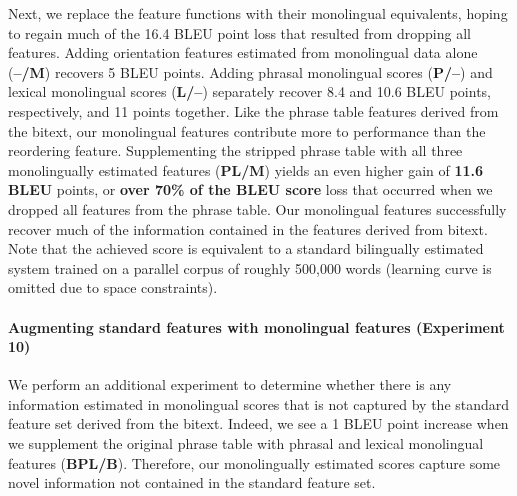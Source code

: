 \documentclass[11pt]{article}
\begin{document}
Next, we replace the feature functions with their monolingual equivalents, hoping to regain much of the 16.4 BLEU point loss that resulted from dropping all features.  Adding orientation features estimated from monolingual data alone ({\bf --/M})  recovers 5 BLEU points. Adding phrasal monolingual scores ({\bf P/--}) and lexical monolingual scores ({\bf L/--}) separately recover 8.4 and 10.6 BLEU points, respectively, and 11 points together. Like the phrase table features derived from the bitext, our monolingual features contribute more to performance than the reordering feature. Supplementing the stripped phrase table with all three monolingually estimated features ({\bf PL/M}) yields an even higher gain of {\bf 11.6 BLEU} points, or {\bf over 70\% of the BLEU score} loss that occurred when we dropped all features from the phrase table. Our monolingual features successfully recover much of the information contained in the features derived from bitext.  Note that the achieved score is equivalent to a standard bilingually estimated system trained on a parallel corpus of roughly 500,000 words (learning curve is omitted due to space constraints).

\paragraph{Augmenting standard features with monolingual features (Experiment 10)} \label{sect:exp:augment}
We perform an additional experiment to determine whether there is any information estimated in monolingual scores that is not captured by the standard feature set derived from the bitext. Indeed, we see a 1 BLEU point increase when we supplement the original phrase table with phrasal and lexical monolingual features ({\bf BPL/B}). Therefore, our monolingually estimated scores capture some novel information not contained in the standard feature set.


\end{document}
